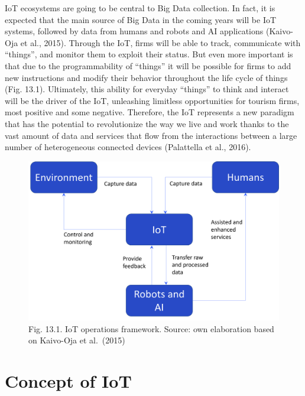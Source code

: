 \documentclass[
  letterpaper,
  DIV=11,
  numbers=noendperiod]{scrreprt}
\begin{document}
IoT ecosystems are going to be central to Big Data collection. In fact,
it is expected that the main source of Big Data in the coming years will
be IoT systems, followed by data from humans and robots and AI
applications (Kaivo-Oja et al., 2015). Through the IoT, firms will be
able to track, communicate with ``things'', and monitor them to exploit
their status. But even more important is that due to the programmability
of ``things'' it will be possible for firms to add new instructions and
modify their behavior throughout the life cycle of things (Fig. 13.1).
Ultimately, this ability for everyday ``things'' to think and interact
will be the driver of the IoT, unleashing limitless opportunities for
tourism firms, most positive and some negative. Therefore, the IoT
represents a new paradigm that has the potential to revolutionize the
way we live and work thanks to the vast amount of data and services that
flow from the interactions between a large number of heterogeneous
connected devices (Palattella et al., 2016).

\begin{figure}

{\centering \includegraphics[width=6.25in,height=\textheight]{img/fig16.png}

}

\caption{Fig. 13.1. IoT operations framework. Source: own elaboration
based on Kaivo-Oja et al.~(2015)}

\end{figure}

\hypertarget{concept-of-iot}{%
\section{Concept of IoT}\label{concept-of-iot}}
\end{document}
